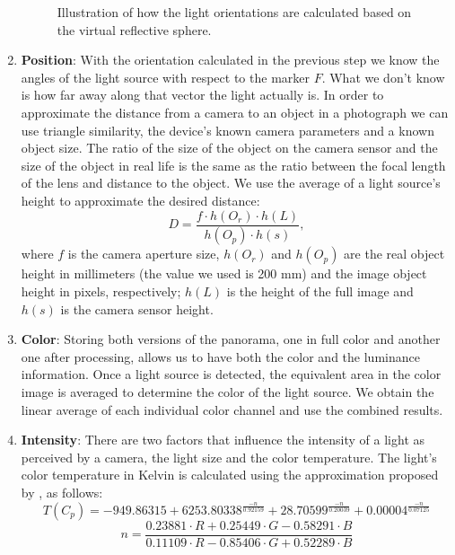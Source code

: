\begin{enumerate}
\begin{figure}[H]
\begin{picture}
    \end{picture}
    \caption{Illustration of how the light orientations are calculated based on the virtual reflective sphere.}
    \label{camMov}
\end{figure} 
\item \textbf{Position}: With the orientation calculated in the previous step we know the angles of the light source with respect to the marker $F$. What we don't know is how far away along that vector the light actually is. In order to approximate the distance from a camera to an object in a photograph we can use triangle similarity, the device's known camera parameters and a known object size. The ratio of the size of the object on the camera sensor and the size of the object in real life is the same as the ratio between the focal length of the lens and distance to the object.
We use the average of a light source's height to approximate the desired distance:
\begin{equation}
   D = \frac{f \cdot h(O_r) \cdot h(L)}{h(O_p) \cdot h(s)},
\end{equation}
where $f$ is the camera aperture size, $h(O_r)$ and $h(O_p)$ are the real object height in millimeters (the value we used is 200 mm) and the image object height in pixels, respectively; $h(L)$ is the height of the full image and $h(s)$ is the camera sensor height.

\item \textbf{Color}: Storing both versions of the panorama, one in full color and another one after processing, allows us to have both the color and the luminance information. Once a light source is detected, the equivalent area in the color image is averaged to determine the color of the light source. We obtain the linear average of each individual color channel and use the combined results.
\item \textbf{Intensity}: There are two factors that influence the intensity of a light as perceived by a camera, the light size and the color temperature. The light's color temperature in Kelvin is calculated using the approximation proposed by \citep{mccamy1992}, as follows:
\begin{equation}
    T(C_p) = -949.86315 + 6253.80338 ^ {\frac{-n}{0.92159} } + 28.70599 ^{\frac{-n}{0.20039} } + 0.00004 ^ {\frac{-n}{0.07125} }
\end{equation}
\begin{equation}
n = {\frac{0.23881\cdot R + 0.25449\cdot G - 0.58291\cdot B}{0.11109\cdot R - 0.85406\cdot G + 0.52289\cdot B} }
\end{equation}


\end{enumerate}
